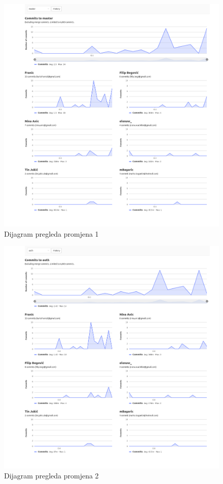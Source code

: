 		\begin{figure}[H]
			\centering
			\includegraphics[width=1.0\linewidth]{"slike/contributors_master"}
			\caption{Dijagram pregleda promjena 1}
			\label{Slika 6.1}
		\end{figure}
	
		\begin{figure}[H]
			\centering
			\includegraphics[width=1.0\linewidth]{"slike/contributors_auth"}
			\caption{Dijagram pregleda promjena 2}
			\label{Slika 6.2}
		\end{figure}
	
